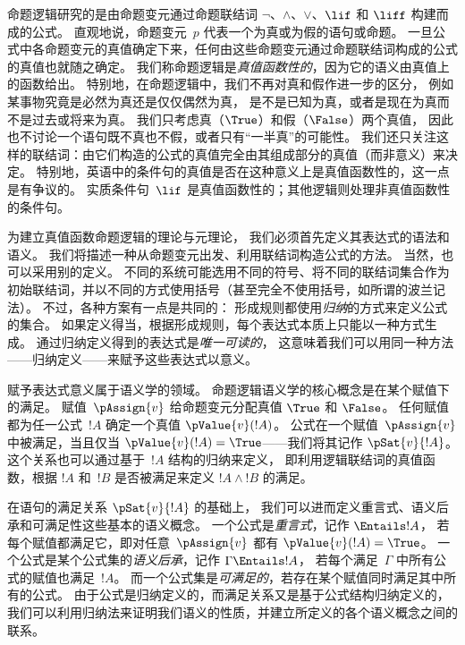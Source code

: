 \documentclass[../../../include/open-logic-section]{subfiles}
\begin{document}


命题逻辑研究的是由命题变元通过命题联结词
$\lnot$、$\land$、$\lor$、$\lif$ 和 $\liff$ 构建而成的公式。
直观地说，命题变元~$p$ 代表一个为真或为假的语句或命题。
一旦公式中各命题变元的真值确定下来，任何由这些命题变元通过命题联结词构成的公式的真值也就随之确定。
我们称命题逻辑是\emph{真值函数性的}，因为它的语义由真值上的函数给出。
特别地，在命题逻辑中，我们不再对真和假作进一步的区分，
例如某事物究竟是必然为真还是仅仅偶然为真，
是不是已知为真，或者是现在为真而不是过去或将来为真。
我们只考虑真（$\True$）和假（$\False$）两个真值，
因此也不讨论一个语句既不真也不假，或者只有“一半真”的可能性。
我们还只关注这样的联结词：由它们构造的公式的真值完全由其组成部分的真值（而非意义）来决定。
特别地，英语中的条件句的真值是否在这种意义上是真值函数性的，这一点是有争议的。
实质条件句~$\lif$ 是真值函数性的；其他逻辑则处理非真值函数性的条件句。

为建立真值函数命题逻辑的理论与元理论，
我们必须首先定义其表达式的语法和语义。
我们将描述一种从命题变元出发、利用联结词构造公式的方法。
当然，也可以采用别的定义。
不同的系统可能选用不同的符号、将不同的联结词集合作为初始联结词，并以不同的方式使用括号（甚至完全不使用括号，如所谓的波兰记法）。
不过，各种方案有一点是共同的：
形成规则都使用\emph{归纳}的方式来定义公式的集合。
如果定义得当，根据形成规则，每个表达式本质上只能以一种方式生成。
通过归纳定义得到的表达式是\emph{唯一可读的}，
这意味着我们可以用同一种方法——归纳定义——来赋予这些表达式以意义。

赋予表达式意义属于语义学的领域。
命题逻辑语义学的核心概念是在某个赋值下的满足。
赋值~$\pAssign{v}$ 给命题变元分配真值 $\True$ 和 $\False$。
任何赋值都为任一公式~$!A$ 确定一个真值 $\pValue{v}(!A)$。
公式在一个赋值~$\pAssign{v}$ 中被满足，当且仅当
$\pValue{v}(!A) = \True$——我们将其记作 $\pSat{v}{!A}$。
这个关系也可以通过基于~$!A$ 结构的归纳来定义，
即利用逻辑联结词的真值函数，根据 $!A$ 和~$!B$ 是否被满足来定义
$!A \land !B$ 的满足。

在语句的满足关系 $\pSat{v}{!A}$ 的基础上，
我们可以进而定义重言式、语义后承和可满足性这些基本的语义概念。
一个公式是\emph{重言式}，记作 $\Entails !A$，
若每个赋值都满足它，即对任意~$\pAssign{v}$ 都有
$\pValue{v}(!A) = \True$。
一个公式是某个公式集的\emph{语义后承}，记作 $\Gamma \Entails !A$，
若每个满足~$\Gamma$ 中所有公式的赋值也满足~$!A$。
而一个公式集是\emph{可满足的}，若存在某个赋值同时满足其中所有的公式。
由于公式是归纳定义的，而满足关系又是基于公式结构归纳定义的，
我们可以利用归纳法来证明我们语义的性质，并建立所定义的各个语义概念之间的联系。
\end{document}
